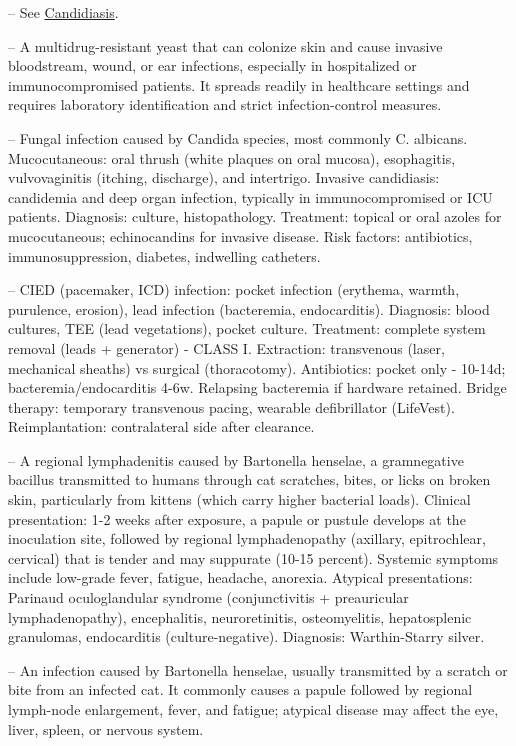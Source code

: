 -- See \hyperlink{Candidiasis}{Candidiasis}.

-- A multidrug-resistant yeast that can colonize skin and cause invasive bloodstream, wound, or ear infections, especially in hospitalized or immunocompromised patients. It spreads readily in healthcare settings and requires laboratory identification and strict infection-control measures.

-- Fungal infection caused by Candida species, most commonly C. albicans. Mucocutaneous: oral thrush (white plaques on oral mucosa), esophagitis, vulvovaginitis (itching, discharge), and intertrigo. Invasive candidiasis: candidemia and deep organ infection, typically in immunocompromised or ICU patients. Diagnosis: culture, histopathology. Treatment: topical or oral azoles for mucocutaneous; echinocandins for invasive disease. Risk factors: antibiotics, immunosuppression, diabetes, indwelling catheters.

-- CIED (pacemaker, ICD) infection: pocket infection (erythema, warmth, purulence, erosion), lead infection (bacteremia, endocarditis). Diagnosis: blood cultures, TEE (lead vegetations), pocket culture. Treatment: complete system removal (leads + generator) - CLASS I. Extraction: transvenous (laser, mechanical sheaths) vs surgical (thoracotomy). Antibiotics: pocket only - 10-14d; bacteremia/endocarditis 4-6w. Relapsing bacteremia if hardware retained. Bridge therapy: temporary transvenous pacing, wearable defibrillator (LifeVest). Reimplantation: contralateral side after clearance.

-- A regional lymphadenitis caused by Bartonella henselae, a gramnegative bacillus transmitted to humans through cat scratches, bites, or licks on broken skin, particularly from kittens (which carry higher bacterial loads). Clinical presentation: 1-2 weeks after exposure, a papule or pustule develops at the inoculation site, followed by regional lymphadenopathy (axillary, epitrochlear, cervical) that is tender and may suppurate (10-15 percent). Systemic symptoms include low-grade fever, fatigue, headache, anorexia. Atypical presentations: Parinaud oculoglandular syndrome (conjunctivitis + preauricular lymphadenopathy), encephalitis, neuroretinitis, osteomyelitis, hepatosplenic granulomas, endocarditis (culture-negative). Diagnosis: Warthin-Starry silver.

-- An infection caused by Bartonella henselae, usually transmitted by a scratch or bite from an infected cat. It commonly causes a papule followed by regional lymph-node enlargement, fever, and fatigue; atypical disease may affect the eye, liver, spleen, or nervous system.

